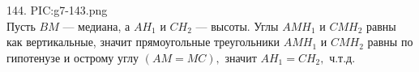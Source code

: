 144. {{PIC:g7-143.png}}\\
Пусть $BM$ --- медиана, а $AH_1$ и $CH_2$ --- высоты. Углы $AMH_1$ и $CMH_2$ равны как вертикальные, значит прямоугольные треугольники $AMH_1$ и $CMH_2$ равны по гипотенузе и острому углу $(AM=MC),$ значит $AH_1=CH_2,$ ч.т.д.\\
